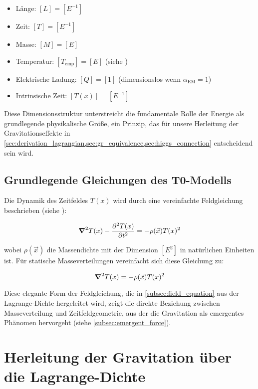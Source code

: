 \documentclass[12pt,a4paper]{article}
\newcommand{\Tfield}{T(x)}
\newcommand{\alphaEM}{\alpha_{\text{EM}}}
\newcommand{\vecx}{\vec{x}}
\begin{document}
	\begin{itemize}
		\item Länge: $[L] = [E^{-1}]$
		\item Zeit: $[T] = [E^{-1}]$
		\item Masse: $[M] = [E]$
		\item Temperatur: $[T_{\text{emp}}] = [E]$ (siehe \cite{pascher_temp_2025})
		\item Elektrische Ladung: $[Q] = [1]$ (dimensionslos wenn $\alphaEM = 1$)
		\item Intrinsische Zeit: $[\Tfield] = [E^{-1}]$
	\end{itemize}
	
	Diese Dimensionsstruktur unterstreicht die fundamentale Rolle der Energie als grundlegende physikalische Größe, ein Prinzip, das für unsere Herleitung der Gravitationseffekte in \cref{sec:derivation_lagrangian,sec:gr_equivalence,sec:higgs_connection} entscheidend sein wird.
	
	\subsection{Grundlegende Gleichungen des T0-Modells}
	\label{subsec:fundamental_equations}
	Die Dynamik des Zeitfeldes \(\Tfield\) wird durch eine vereinfachte Feldgleichung beschrieben (siehe \cite{pascher_lagrange_2025,pascher_higgs_2025}):
	
	\begin{equation}
		\label{eq:time_field_dynamic}
		\grad^2 \Tfield - \frac{\partial^2 \Tfield}{\partial t^2} = -\rho(\vecx) \Tfield^2
	\end{equation}
	
	wobei \(\rho(\vecx)\) die Massendichte mit der Dimension \([E^2]\) in natürlichen Einheiten ist. Für statische Masseverteilungen vereinfacht sich diese Gleichung zu:
	
	\begin{equation}
		\label{eq:time_field_static}
		\grad^2 \Tfield = -\rho(\vecx) \Tfield^2
	\end{equation}
	
	Diese elegante Form der Feldgleichung, die in \cref{subsec:field_equation} aus der Lagrange-Dichte hergeleitet wird, zeigt die direkte Beziehung zwischen Masseverteilung und Zeitfeldgeometrie, aus der die Gravitation als emergentes Phänomen hervorgeht (siehe \cref{subsec:emergent_force}).
	
	\section{Herleitung der Gravitation über die Lagrange-Dichte}
	\label{sec:derivation_lagrangian}
	
\end{document}
